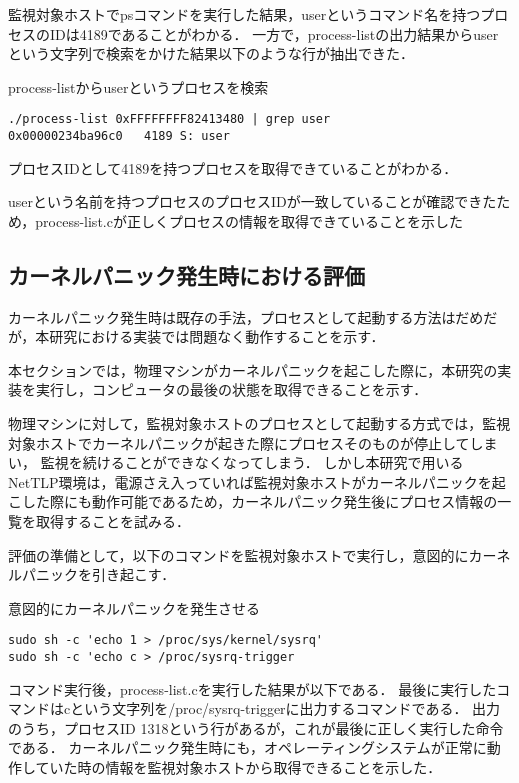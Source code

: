 監視対象ホストでpsコマンドを実行した結果，userというコマンド名を持つプロセスのIDは4189であることがわかる．
一方で，process-listの出力結果からuserという文字列で検索をかけた結果以下のような行が抽出できた．

\begin{itembox}[l]{process-listからuserというプロセスを検索}
    \begin{verbatim}
./process-list 0xFFFFFFFF82413480 | grep user
0x00000234ba96c0   4189 S: user
    \end{verbatim}
\end{itembox}

プロセスIDとして4189を持つプロセスを取得できていることがわかる．

userという名前を持つプロセスのプロセスIDが一致していることが確認できたため，process-list.cが正しくプロセスの情報を取得できていることを示した

\subsection{カーネルパニック発生時における評価}

カーネルパニック発生時は既存の手法，プロセスとして起動する方法はだめだが，本研究における実装では問題なく動作することを示す．

本セクションでは，物理マシンがカーネルパニックを起こした際に，本研究の実装を実行し，コンピュータの最後の状態を取得できることを示す．

物理マシンに対して，監視対象ホストのプロセスとして起動する方式では，監視対象ホストでカーネルパニックが起きた際にプロセスそのものが停止してしまい，
監視を続けることができなくなってしまう．
しかし本研究で用いるNetTLP環境は，電源さえ入っていれば監視対象ホストがカーネルパニックを起こした際にも動作可能であるため，カーネルパニック発生後にプロセス情報の一覧を取得することを試みる．

評価の準備として，以下のコマンドを監視対象ホストで実行し，意図的にカーネルパニックを引き起こす．

\begin{itembox}[l]{意図的にカーネルパニックを発生させる}
    \begin{verbatim}
sudo sh -c 'echo 1 > /proc/sys/kernel/sysrq'
sudo sh -c 'echo c > /proc/sysrq-trigger
    \end{verbatim}
\end{itembox}

コマンド実行後，process-list.cを実行した結果が以下である．
最後に実行したコマンドはcという文字列を/proc/sysrq-triggerに出力するコマンドである．
出力のうち，プロセスID 1318という行があるが，これが最後に正しく実行した命令である．
カーネルパニック発生時にも，オペレーティングシステムが正常に動作していた時の情報を監視対象ホストから取得できることを示した．

